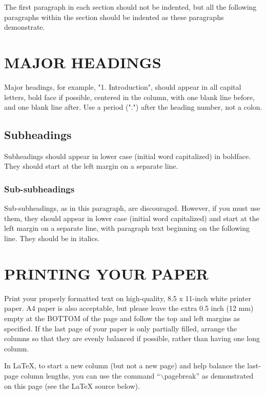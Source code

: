 \documentclass{article}
\begin{document}
The first paragraph in each section should not be indented, but all the
following paragraphs within the section should be indented as these paragraphs
demonstrate.

\section{MAJOR HEADINGS}
\label{sec:majhead}

Major headings, for example, "1. Introduction", should appear in all capital
letters, bold face if possible, centered in the column, with one blank line
before, and one blank line after. Use a period (".") after the heading number,
not a colon.

\subsection{Subheadings}
\label{ssec:subhead}

Subheadings should appear in lower case (initial word capitalized) in
boldface.  They should start at the left margin on a separate line.
 
\subsubsection{Sub-subheadings}
\label{sssec:subsubhead}

Sub-subheadings, as in this paragraph, are discouraged. However, if you
must use them, they should appear in lower case (initial word
capitalized) and start at the left margin on a separate line, with paragraph
text beginning on the following line.  They should be in italics.

\section{PRINTING YOUR PAPER}
\label{sec:print}

Print your properly formatted text on high-quality, 8.5 x 11-inch white printer
paper. A4 paper is also acceptable, but please leave the extra 0.5 inch (12 mm)
empty at the BOTTOM of the page and follow the top and left margins as
specified.  If the last page of your paper is only partially filled, arrange
the columns so that they are evenly balanced if possible, rather than having
one long column.

In LaTeX, to start a new column (but not a new page) and help balance the
last-page column lengths, you can use the command ``$\backslash$pagebreak'' as
demonstrated on this page (see the LaTeX source below).
\end{document}
